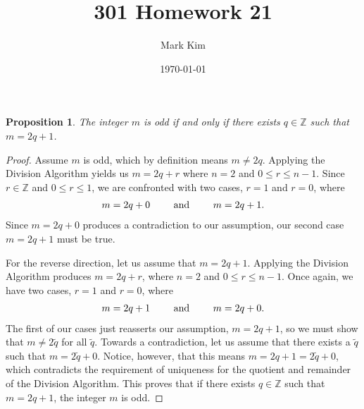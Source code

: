 \documentclass[12pt]{amsart}
\title{301 Homework 21}
\author{Mark Kim}
\date{\today}
\newcommand{\Z}{\mathbb{Z}}
\newtheorem*{proposition}{Proposition}
\begin{document}
\maketitle

\begin{proposition}
The integer $m$ is odd if and only if there exists $q\in\Z$ such that $m=2q+1$.
\end{proposition}

\begin{proof}
Assume $m$ is odd, which by definition means $m\neq 2q$.  Applying the Division Algorithm yields us $m=2q +r$ where $n=2$ and $0\leq r \leq n-1$.  Since $r\in\Z$ and $0\leq r\leq 1$, we are confronted with two cases, $r=1$ and $r=0$, where
\[
\begin{tabular}{ c c c c c }
$m=2q+0$ & & and & & $m=2q+1$.
\end{tabular}
\]
Since $m=2q+0$ produces a contradiction to our assumption, our second case $m=2q+1$ must be true.

For the reverse direction, let us assume that $m=2q+1$.  Applying the Division Algorithm produces $m=2q + r$, where $n=2$ and $0\leq r \leq n-1$.  Once again, we have two cases, $r=1$ and $r=0$, where
\[
\begin{tabular}{ c c c c c }
$m=2q+1$ & & and & & $m=2q+0$.
\end{tabular}
\]
The first of our cases just reasserts our assumption, $m=2q+1$, so we must show that $m\neq2\tilde{q}$ for all $\tilde{q}$.  Towards a contradiction, let us assume that there exists a $\tilde{q}$ such that $m = 2\tilde{q} +0$.  Notice, however, that this means $m=2q +1=2\tilde{q} + 0$, which contradicts the requirement of uniqueness for the quotient and remainder of the Division Algorithm.  This proves that if there exists $q\in\Z$ such that $m=2q+1$, the integer $m$ is odd.
\end{proof}
\end{document}
